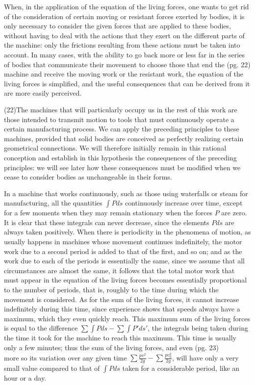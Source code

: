 \documentclass{book}
\begin{document}
When, in the application of the equation of the living forces, one wants to get rid of the consideration of certain moving or resistant forces exerted by bodies, it is only necessary to consider the given forces that are applied to these bodies, without having to deal with the actions that they exert on the different parts of the machine: only the frictions resulting from these actions must be taken into account. In many cases, with the ability to go back more or less far in the series of bodies that communicate their movement to choose those that end the 
\newpage
(pg. 22)\\
machine and receive the moving work or the resistant work, the equation of the living forces is simplified, and the useful consequences that can be derived from it are more easily perceived.

(22)The machines that will particularly occupy us in the rest of this work are those intended to transmit motion to tools that must continuously operate a certain manufacturing process. We can apply the preceding principles to these machines, provided that solid bodies are conceived as perfectly realizing certain geometrical connections. We will therefore initially remain in this rational conception and establish in this hypothesis the consequences of the preceding principles: we will see later how these consequences must be modified when we cease to consider bodies as unchangeable in their forms.

In a machine that works continuously, such as those using waterfalls or steam for manufacturing, all the quantities \(\int Pds\) continuously increase over time, except for a few moments when they may remain stationary when the forces \(P\) are zero. It is clear that these integrals can never decrease, since the elements \(Pds\) are always taken positively. When there is periodicity in the phenomena of motion, as usually happens in machines whose movement continues indefinitely, the motor work due to a second period is added to that of the first, and so on; and as the work due to each of the periods is essentially the same, since we assume that all circumstances are almost the same, it follows that the total motor work that must appear in the equation of the living forces becomes essentially proportional to the number of periods, that is, roughly to the time during which the movement is considered. As for the sum of the living forces, it cannot increase indefinitely during this time, since experience shows that speeds always have a maximum, which they even quickly reach. This maximum sum of the living forces is equal to the difference \(\sum \int Pds - \sum \int P'ds'\), the integrals being taken during the time it took for the machine to reach this maximum. This time is usually only a few minutes; thus the sum of the living forces, and even 
\newpage(pg. 23)\\
more so its variation over any given time \(\sum \frac{pv^2}{2g} - \sum \frac{pv_0^2}{2g}\), will have only a very small value compared to that of \(\int Pds\) taken for a considerable period, like an hour or a day.
\end{document}
